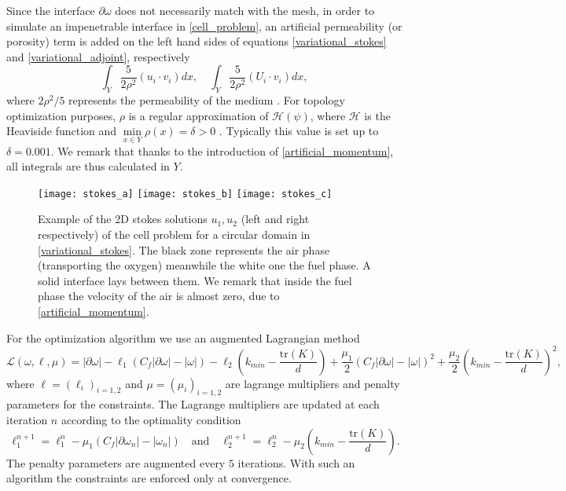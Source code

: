 \documentclass{article}
\begin{document}
Since the interface $\partial \omega$ does not necessarily match with the mesh, in order to simulate an impenetrable interface in \eqref{cell_problem}, an artificial permeability (or porosity) term is added on the {left hand sides} of equations \eqref{variational_stokes} and \eqref{variational_adjoint}, respectively \begin{equation}
\label{artificial_momentum}
\int_{Y}\frac{5}{2\rho^2}(u_i \cdot v_i)dx,\quad \int_{Y}\frac{5}{2\rho^2}(U_i \cdot v_i)dx,
\end{equation}
where $2\rho^2/5$ represents the permeability of the medium \cite{brinkman1947calculation,durlofsky1987analysis}. For topology optimization purposes, $\rho$ is a regular approximation of $\mathcal{H}(\psi)$, where $\mathcal{H}$ is the Heaviside function and $\min \limits_{x\in Y} \rho (x)=\delta>0$ \cite{bendsoe1995methods,borvall_petersson_2002}. Typically this value is set up to $\delta=0.001$. We remark that thanks to the introduction of  \eqref{artificial_momentum}, all integrals are thus calculated in $Y$.




\begin{figure}[h]
\centering
\texttt{[image: stokes\_a]}
\texttt{[image: stokes\_b]}
\texttt{[image: stokes\_c]}
\caption{Example of the 2D stokes solutions $u_1,u_2$ (left and right respectively) of the cell problem for a circular domain in \eqref{variational_stokes}. The black zone represents the air phase (transporting the oxygen) meanwhile the white one the fuel phase. A solid interface lays between them. We remark that inside the fuel phase the velocity of the air is almost zero, due to \eqref{artificial_momentum}.}
\end{figure}

For the optimization algorithm we use an augmented Lagrangian method $$
\mathcal{L}(\omega,\ell,\mu) = |\partial \omega|-\ell_{1}(C_f|\partial \omega|-|\omega|)-\ell_2 \left (k_{min}-\frac{\text{tr}(K)}{d} \right)+
\frac{\mu_1}{2}(C_f|\partial \omega|-|\omega|)^2+\frac{\mu_2}{2} \left(k_{min}-\frac{\text{tr}(K)}{d} \right)^2,
$$  
where $\ell=(\ell_i)_{i=1,2}$ and $\mu=(\mu_i)_{i=1,2}$ are lagrange multipliers and penalty parameters for the constraints. The Lagrange multipliers are updated at each iteration $n$ according to the optimality condition
\[
\ell_{1}^{n+1}=\ell_{1}^{n}-\mu_{1}(C_f|\partial \omega_n|-|\omega_n|)
\quad \mbox{and} \quad \ell_{2}^{n+1}=\ell_{2}^{n}-\mu_{2}\left(k_{min}-\frac{\text{tr}(K)}{d}\right).
\]
 The penalty parameters are augmented every $5$ iterations. With such an algorithm the constraints are enforced only at convergence.\\ 
 
\end{document}
